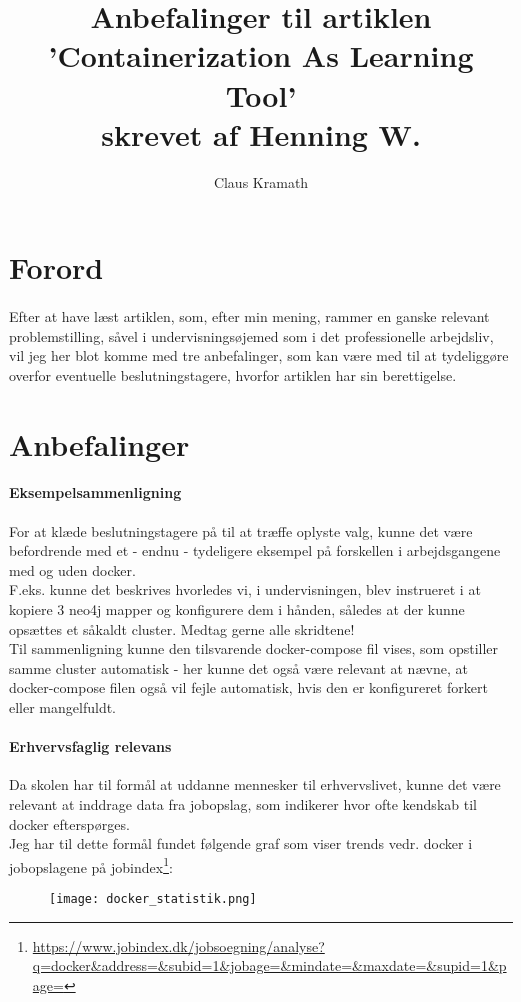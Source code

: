 \documentclass{article}
\title{%
Anbefalinger til artiklen \\ 
'Containerization As Learning Tool' \\
skrevet af Henning W.
}
\author{Claus Kramath}
\begin{document}
\maketitle
\thispagestyle{empty}
\newpage
\tableofcontents
\thispagestyle{empty} 
\newpage
\section{Forord}
\paragraph{}
Efter at have læst artiklen, som, efter min mening, rammer en ganske relevant problemstilling, såvel i undervisningsøjemed som i det professionelle arbejdsliv, vil jeg her blot komme med tre anbefalinger, som kan være med til at tydeliggøre overfor eventuelle beslutningstagere, hvorfor artiklen har sin berettigelse.\\
\section{Anbefalinger}
\paragraph{Eksempelsammenligning}
For at klæde beslutningstagere på til at træffe oplyste valg, kunne det være befordrende med et - endnu - tydeligere eksempel på forskellen i arbejdsgangene med og uden docker. \\
F.eks. kunne det beskrives hvorledes vi, i undervisningen, blev instrueret i at kopiere 3 neo4j mapper og konfigurere dem i hånden, således at der kunne opsættes et såkaldt cluster. Medtag gerne alle skridtene!\\
Til sammenligning kunne den tilsvarende docker-compose fil vises, som opstiller samme cluster automatisk - her kunne det også være relevant at nævne, at docker-compose filen også vil fejle automatisk, hvis den er konfigureret forkert eller mangelfuldt.
\paragraph{Erhvervsfaglig relevans}
Da skolen har til formål at uddanne mennesker til erhvervslivet, kunne det være relevant at inddrage data fra jobopslag, som indikerer hvor ofte kendskab til docker efterspørges.\\
Jeg har til dette formål fundet følgende graf som viser trends vedr. docker i jobopslagene på jobindex\footnote{\url{https://www.jobindex.dk/jobsoegning/analyse?q=docker\&address=\&subid=1\&jobage=\&mindate=\&maxdate=\&supid=1\&page=}}:
\begin{figure}[htb]
    \centering
    \texttt{[image: docker\_statistik.png]}    
    \label{fig:docker}
\end{figure}
\end{document}

